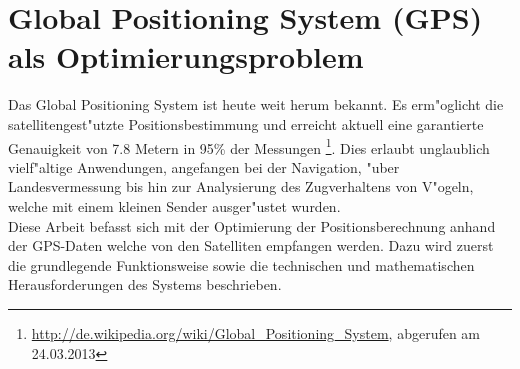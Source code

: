 %
%
%

\chapter{Global Positioning System (GPS) als Optimierungsproblem}
	Das Global Positioning System ist heute weit herum bekannt. Es erm"oglicht die satellitengest"utzte Positionsbestimmung und erreicht aktuell eine garantierte Genauigkeit von 7.8 Metern in 95\% der Messungen \footnote{\url{http://de.wikipedia.org/wiki/Global_Positioning_System}, abgerufen am 24.03.2013}. Dies erlaubt unglaublich vielf"altige Anwendungen, angefangen bei der Navigation, "uber Landesvermessung bis hin zur Analysierung des Zugverhaltens von V"ogeln, welche mit einem kleinen Sender ausger"ustet wurden.\\[0.15cm]	
	Diese Arbeit befasst sich mit der Optimierung der Positionsberechnung anhand der GPS-Daten welche von den Satelliten empfangen werden. Dazu wird zuerst die grundlegende Funktionsweise sowie die technischen und mathematischen Herausforderungen des Systems beschrieben.
	
